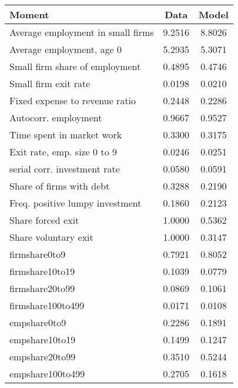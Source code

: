  \begin{tabular}{lcc} \hline \hline 
 Moment & Data & Model \\ 
\hline 
Average employment in small firms  &    9.2516 &   8.8026 \\ 
Average employment, age 0  &    5.2935 &   5.3071 \\ 
Small firm share of employment  &    0.4895 &   0.4746 \\ 
Small firm exit rate  &    0.0198 &   0.0210 \\ 
Fixed expense to revenue ratio  &    0.2448 &   0.2286 \\ 
Autocorr. employment  &    0.9667 &   0.9527 \\ 
Time spent in market work  &    0.3300 &   0.3175 \\ 
Exit rate, emp. size 0 to 9  &    0.0246 &   0.0251 \\ 
serial corr. investment rate  &    0.0580 &   0.0591 \\ 
Share of firms with debt  &    0.3288 &   0.2190 \\ 
Freq. positive lumpy investment  &    0.1860 &   0.2123 \\ 
Share forced exit  &    1.0000 &   0.5362 \\ 
Share voluntary exit  &    1.0000 &   0.3147 \\ 
firmshare0to9  &    0.7921 &   0.8052 \\ 
firmshare10to19  &    0.1039 &   0.0779 \\ 
firmshare20to99  &    0.0869 &   0.1061 \\ 
firmshare100to499  &    0.0171 &   0.0108 \\ 
empshare0to9  &    0.2286 &   0.1891 \\ 
empshare10to19  &    0.1499 &   0.1247 \\ 
empshare20to99  &    0.3510 &   0.5244 \\ 
empshare100to499  &    0.2705 &   0.1618 \\ 
\hline \hline 
 \end{tabular} 
